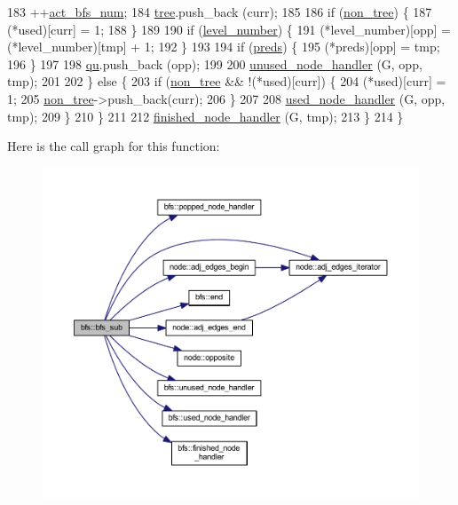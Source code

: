 \begin{DoxyCode}
183         ++\mbox{\hyperlink{classbfs_a5a4adad9562896536b8b58ab237e8478}{act\_bfs\_num}};
184         \mbox{\hyperlink{classbfs_a8bc83afea6d1066ea4ceca3007799912}{tree}}.push\_back (curr);
185         
186         \textcolor{keywordflow}{if} (\mbox{\hyperlink{classbfs_a056b2131db11e62eb8f41c8dcc117d2e}{non\_tree}}) \{
187             (*used)[curr] = 1;
188         \}
189 
190         \textcolor{keywordflow}{if} (\mbox{\hyperlink{classbfs_aab92e9d128612c28324aafe4750dbc84}{level\_number}}) \{
191             (*level\_number)[opp] = (*level\_number)[tmp] + 1;
192         \}
193     
194         \textcolor{keywordflow}{if} (\mbox{\hyperlink{classbfs_a3bac5ed333bb78a30a67099c3b94aa0c}{preds}}) \{
195             (*preds)[opp] = tmp;
196         \}
197 
198         \mbox{\hyperlink{classbfs_ad2ef1030dcc16a1056e6ef6dfc3f1b6b}{qu}}.push\_back (opp);
199 
200         \mbox{\hyperlink{classbfs_a6e31b8d063a85d92f2b44ff41d2050aa}{unused\_node\_handler}} (G, opp, tmp);
201 
202         \} \textcolor{keywordflow}{else} \{
203         \textcolor{keywordflow}{if} (\mbox{\hyperlink{classbfs_a056b2131db11e62eb8f41c8dcc117d2e}{non\_tree}} && !(*used)[curr]) \{
204             (*used)[curr] = 1;
205             \mbox{\hyperlink{classbfs_a056b2131db11e62eb8f41c8dcc117d2e}{non\_tree}}->push\_back(curr);
206         \}
207 
208         \mbox{\hyperlink{classbfs_a5514649937b2e27f0bfc41ba868cb156}{used\_node\_handler}} (G, opp, tmp);
209         \}
210     \}
211 
212     \mbox{\hyperlink{classbfs_a4d3f1d569910388b2ccece7cedd8bae4}{finished\_node\_handler}} (G, tmp);
213     \}           
214 \}
\end{DoxyCode}
Here is the call graph for this function\+:\nopagebreak
\begin{figure}[H]
\begin{center}
\leavevmode
\includegraphics[width=350pt]{classbfs_a567815d3b63e802420f4b536749a1ad2_cgraph}
\end{center}
\end{figure}
